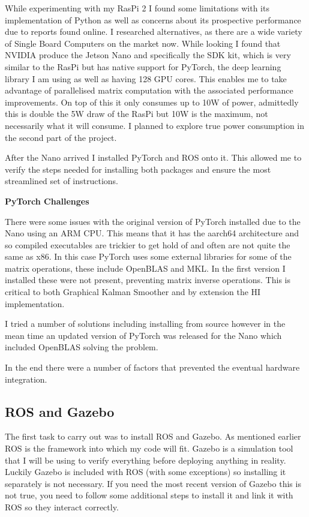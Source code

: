 \documentclass[]{../resources/final_report}
\begin{document}
While experimenting with my RasPi 2 I found some limitations with its implementation of Python as well as concerns about its prospective performance due to reports found online. I researched alternatives, as there are a wide variety of Single Board Computers on the market now. While looking I found that NVIDIA produce the Jetson Nano and specifically the SDK kit, which is very similar to the RasPi but has native support for PyTorch, the deep learning library I am using as well as having 128 GPU cores. This enables me to take advantage of parallelised matrix computation with the associated performance improvements. On top of this it only consumes up to 10W of power, admittedly this is double the 5W draw of the RasPi but 10W is the maximum, not necessarily what it will consume. I planned to explore true power consumption in the second part of the project.

After the Nano arrived I installed PyTorch and ROS onto it. This allowed me to verify the steps needed for installing both packages and ensure the most streamlined set of instructions.

\textbf{PyTorch Challenges}

There were some issues with the original version of PyTorch installed due to the Nano using an ARM CPU. This means that it has the aarch64 architecture and so compiled executables are trickier to get hold of and often are not quite the same as x86. In this case PyTorch uses some external libraries for some of the matrix operations, these include OpenBLAS and MKL. In the first version I installed these were not present, preventing matrix inverse operations. This is critical to both Graphical Kalman Smoother and by extension the HI implementation.

I tried a number of solutions including installing from source however in the mean time an updated version of PyTorch was released for the Nano which included OpenBLAS solving the problem.

In the end there were a number of factors that prevented the eventual hardware integration.


\subsection{ROS and Gazebo}

The first task to carry out was to install ROS and Gazebo. As mentioned earlier ROS is the framework into which my code will fit. Gazebo is a simulation tool that I will be using to verify everything before deploying anything in reality. Luckily Gazebo is included with ROS (with some exceptions) so installing it separately is not necessary. If you need the most recent version of Gazebo this is not true, you need to follow some additional steps to install it and link it with ROS so they interact correctly.
\end{document}
